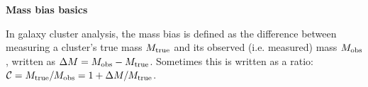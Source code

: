 \documentclass[12pt]{article}
\begin{document}
\noindent
{\bf Mass bias basics}

In galaxy cluster analysis, the mass bias is defined as the difference between measuring a cluster's true mass $M_{\rm true}$ and its observed (i.e. measured) mass $M_{\rm obs}$, written as $\Delta M = M_{\rm obs}-M_{\rm true}$. Sometimes this is written as a ratio: $\mathcal{C} = M_{\rm true}/M_{\rm obs} = 1+\Delta M/M_{\rm true}$.
\end{document}
